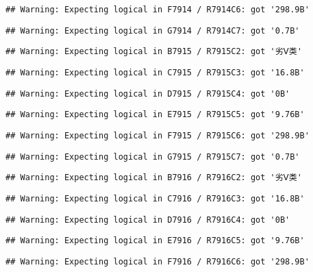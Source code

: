 \documentclass[
]{article}
\begin{document}
\begin{verbatim}
## Warning: Expecting logical in F7914 / R7914C6: got '298.9B'
\end{verbatim}

\begin{verbatim}
## Warning: Expecting logical in G7914 / R7914C7: got '0.7B'
\end{verbatim}

\begin{verbatim}
## Warning: Expecting logical in B7915 / R7915C2: got '劣Ⅴ类'
\end{verbatim}

\begin{verbatim}
## Warning: Expecting logical in C7915 / R7915C3: got '16.8B'
\end{verbatim}

\begin{verbatim}
## Warning: Expecting logical in D7915 / R7915C4: got '0B'
\end{verbatim}

\begin{verbatim}
## Warning: Expecting logical in E7915 / R7915C5: got '9.76B'
\end{verbatim}

\begin{verbatim}
## Warning: Expecting logical in F7915 / R7915C6: got '298.9B'
\end{verbatim}

\begin{verbatim}
## Warning: Expecting logical in G7915 / R7915C7: got '0.7B'
\end{verbatim}

\begin{verbatim}
## Warning: Expecting logical in B7916 / R7916C2: got '劣Ⅴ类'
\end{verbatim}

\begin{verbatim}
## Warning: Expecting logical in C7916 / R7916C3: got '16.8B'
\end{verbatim}

\begin{verbatim}
## Warning: Expecting logical in D7916 / R7916C4: got '0B'
\end{verbatim}

\begin{verbatim}
## Warning: Expecting logical in E7916 / R7916C5: got '9.76B'
\end{verbatim}

\begin{verbatim}
## Warning: Expecting logical in F7916 / R7916C6: got '298.9B'
\end{verbatim}
\end{document}
